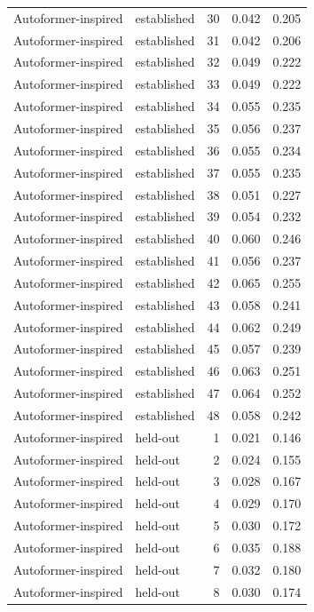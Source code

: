 \begin{tabular}{llrrr}
Autoformer-inspired & established & 30 & 0.042 & 0.205 \\
Autoformer-inspired & established & 31 & 0.042 & 0.206 \\
Autoformer-inspired & established & 32 & 0.049 & 0.222 \\
Autoformer-inspired & established & 33 & 0.049 & 0.222 \\
Autoformer-inspired & established & 34 & 0.055 & 0.235 \\
Autoformer-inspired & established & 35 & 0.056 & 0.237 \\
Autoformer-inspired & established & 36 & 0.055 & 0.234 \\
Autoformer-inspired & established & 37 & 0.055 & 0.235 \\
Autoformer-inspired & established & 38 & 0.051 & 0.227 \\
Autoformer-inspired & established & 39 & 0.054 & 0.232 \\
Autoformer-inspired & established & 40 & 0.060 & 0.246 \\
Autoformer-inspired & established & 41 & 0.056 & 0.237 \\
Autoformer-inspired & established & 42 & 0.065 & 0.255 \\
Autoformer-inspired & established & 43 & 0.058 & 0.241 \\
Autoformer-inspired & established & 44 & 0.062 & 0.249 \\
Autoformer-inspired & established & 45 & 0.057 & 0.239 \\
Autoformer-inspired & established & 46 & 0.063 & 0.251 \\
Autoformer-inspired & established & 47 & 0.064 & 0.252 \\
Autoformer-inspired & established & 48 & 0.058 & 0.242 \\
Autoformer-inspired & held-out & 1 & 0.021 & 0.146 \\
Autoformer-inspired & held-out & 2 & 0.024 & 0.155 \\
Autoformer-inspired & held-out & 3 & 0.028 & 0.167 \\
Autoformer-inspired & held-out & 4 & 0.029 & 0.170 \\
Autoformer-inspired & held-out & 5 & 0.030 & 0.172 \\
Autoformer-inspired & held-out & 6 & 0.035 & 0.188 \\
Autoformer-inspired & held-out & 7 & 0.032 & 0.180 \\
Autoformer-inspired & held-out & 8 & 0.030 & 0.174 \\

\end{tabular}
